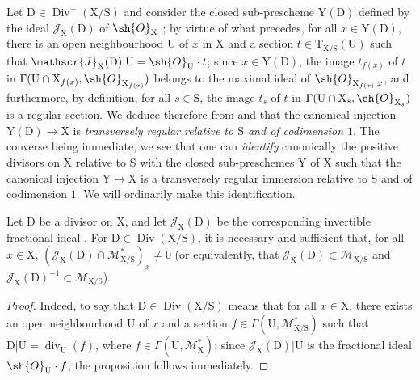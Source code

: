 \begin{env}[21.15.3bis]
\label{IV.21.15.3bis}
Let $\mathrm{D}\in\operatorname{Div}^+(\mathrm{X}/\mathrm{S})$ and consider the closed sub-prescheme $\mathrm{Y}(\mathrm{D})$ defined by the ideal $\mathscr{J}_{\mathrm{X}}(\mathrm{D})$ of $\sh{O}_{\mathrm{X}}$ ; by virtue of what precedes, for all $x\in\mathrm{Y}(\mathrm{D})$, there is an open neighbourhood $\mathrm{U}$ of $x$ in $\mathrm{X}$ and a section $t\in\mathrm{T}_{\mathrm{X}/\mathrm{S}}(\mathrm{U})$ such that $\mathscr{J}_{\mathrm{X}}(\mathrm{D})|\mathrm{U}=\sh{O}_{\mathrm{U}}\cdot t$; since $x\in\mathrm{Y}(\mathrm{D})$, the image $t_{f(x)}$ of $t$ in $\Gamma(\mathrm{U}\cap\mathrm{X}_{f(x)},\sh{O}_{\mathrm{X}_{f(x)}})$ belongs to the maximal ideal of $\sh{O}_{\mathrm{X}_{f(x)},x}$, and furthermore, by definition, for all $s\in\mathrm{S}$, the image $t_s$ of $t$ in $\Gamma(\mathrm{U}\cap\mathrm{X}_s,\sh{O}_{\mathrm{X}_s})$ is a regular section.
We deduce therefore from  and  that the canonical injection $\mathrm{Y}(\mathrm{D})\to\mathrm{X}$ is \emph{transversely regular relative to $\mathrm{S}$ and of codimension $1$}.
The converse being immediate, we see that one can \emph{identify} canonically the positive divisors on $\mathrm{X}$ relative to $\mathrm{S}$ with the closed sub-preschemes $\mathrm{Y}$ of $\mathrm{X}$ such that the canonical injection $\mathrm{Y}\to\mathrm{X}$ is a transversely regular immersion relative to $\mathrm{S}$ and of codimension $1$.
We will ordinarily make this identification.
\end{env}

\begin{proposition}[21.15.4]
\label{IV.21.15.4}
Let $\mathrm{D}$ be a divisor on $\mathrm{X}$, and let $\mathscr{J}_{\mathrm{X}}(\mathrm{D})$ be the corresponding invertible fractional ideal .
For $\mathrm{D}\in\operatorname{Div}(\mathrm{X}/\mathrm{S})$, it is necessary and sufficient that, for all $x\in\mathrm{X}$, $(\mathscr{J}_{\mathrm{X}}(\mathrm{D})\cap\mathscr{M}_{\mathrm{X}/\mathrm{S}}^*)_x\neq 0$ (or equivalently, that $\mathscr{J}_{\mathrm{X}}(\mathrm{D})\subset\mathscr{M}_{\mathrm{X}/\mathrm{S}}$ and $\mathscr{J}_{\mathrm{X}}(\mathrm{D})^{-1}\subset\mathscr{M}_{\mathrm{X}/\mathrm{S}}$).
\end{proposition}

\begin{proof}
Indeed, to say that $\mathrm{D}\in\operatorname{Div}(\mathrm{X}/\mathrm{S})$ means that for all $x\in\mathrm{X}$, there exists an open neighbourhood $\mathrm{U}$ of $x$ and a section $f\in\Gamma(\mathrm{U},\mathscr{M}_{\mathrm{X}/\mathrm{S}}^*)$ such that $\mathrm{D}|\mathrm{U}=\operatorname{div}_{\mathrm{U}}(f)$, where $f\in\Gamma(\mathrm{U},\mathscr{M}_{\mathrm{X}}^*)$; since $\mathscr{J}_{\mathrm{X}}(\mathrm{D})|\mathrm{U}$ is the fractional ideal $\sh{O}_{\mathrm{U}}\cdot f$, the proposition follows immediately.
\end{proof}

